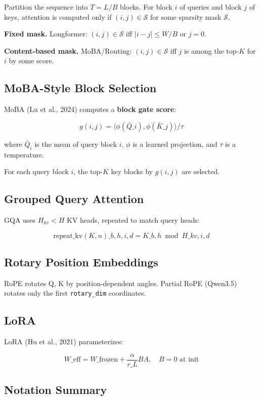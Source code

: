 Partition the sequence into $T = L / B$ blocks. For block $i$ of queries 
and block $j$ of keys, attention is computed only if $(i, j) \in \mathcal{S}$ 
for some sparsity mask $\mathcal{S}$.

\textbf{Fixed mask.} Longformer: $(i, j) \in \mathcal{S}$ iff $|i - j| \leq W/B$ 
or $j = 0$.

\textbf{Content-based mask.} MoBA/Routing: $(i, j) \in \mathcal{S}$ iff $j$ 
is among the top-$K$ for $i$ by some score.

\subsection{MoBA-Style Block Selection}

MoBA (Lu et al., 2024) computes a \textbf{block gate score}:

\[
g(i, j) = \langle \phi(\bar{Q}\_i), \phi(\bar{K}\_j) \rangle / \tau
\tag{3.2}
\]

where $\bar{Q}_i$ is the mean of query block $i$, $\phi$ is a learned 
projection, and $\tau$ is a temperature.

For each query block $i$, the top-$K$ key blocks by $g(i, j)$ are selected.

\subsection{Grouped Query Attention}

GQA uses $H_{kv} < H$ KV heads, repeated to match query heads:

\[
\text{repeat\_kv}(K, n)\_{b, h, i, d} = K\_{b, h \bmod H\_{kv}, i, d}
\tag{3.3}
\]

\subsection{Rotary Position Embeddings}

RoPE rotates Q, K by position-dependent angles. Partial RoPE (Qwen3.5) 
rotates only the first \texttt{rotary\_dim} coordinates.

\subsection{LoRA}

LoRA (Hu et al., 2021) parameterizes:

\[
W\_\text{eff} = W\_\text{frozen} + \frac{\alpha}{r\_L} B A, \quad B = 0 \text{ at init}
\tag{3.4}
\]

\subsection{Notation Summary}

